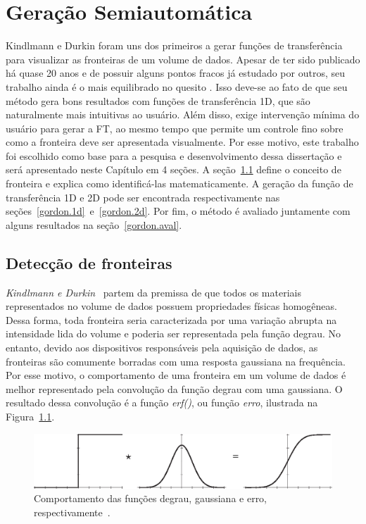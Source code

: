 
\chapter{Geração Semiautomática}
\label{gordon}

	Kindlmann e Durkin foram uns dos primeiros a gerar funções de transferência para visualizar as fronteiras de um volume de dados. Apesar de ter sido publicado há quase 20 anos e de possuir alguns pontos fracos já estudado por outros, seu trabalho ainda é o mais equilibrado no quesito . Isso deve-se ao fato de que seu método gera bons resultados com funções de transferência 1D, que são naturalmente mais intuitivas ao usuário. Além disso, exige intervenção mínima do usuário para gerar a FT, ao mesmo tempo que permite um controle fino sobre como a fronteira deve ser apresentada visualmente. Por esse motivo, este trabalho foi escolhido como base para a pesquisa e desenvolvimento dessa dissertação e será apresentado neste Capítulo em 4 seções. A seção~\ref{gordon.bound} define o conceito de fronteira e explica como identificá-las matematicamente. A geração da função de transferência 1D e 2D pode ser encontrada respectivamente nas seções~\ref{gordon.1d}~e~\ref{gordon.2d}. Por fim, o método é avaliado juntamente com alguns resultados na seção~\ref{gordon.aval}.
	
\section{Detecção de fronteiras}
\label{gordon.bound}
	\textit{Kindlmann e Durkin}~\cite{gordon} partem da premissa de que todos os materiais representados no volume de dados possuem propriedades físicas homogêneas. Dessa forma, toda fronteira seria caracterizada por uma variação abrupta na intensidade lida do volume e poderia ser representada pela função degrau. No entanto, devido aos dispositivos responsáveis pela aquisição de dados, as fronteiras são comumente borradas com uma resposta gaussiana na frequência. Por esse motivo, o comportamento de uma fronteira em um volume de dados é melhor representado pela convolução da função degrau com uma gaussiana. O resultado dessa convolução é a função \textit{erf()}, ou função \textit{erro}, ilustrada na Figura~\ref{fig:boundary_model}.
	
\begin{figure}[h]
	\centering
	\includegraphics[width=1\textwidth]{images/gordon}
	\caption{Comportamento das funções degrau, gaussiana e erro, respectivamente~\cite{gordon}.}
	\label{fig:boundary_model}
\end{figure}

